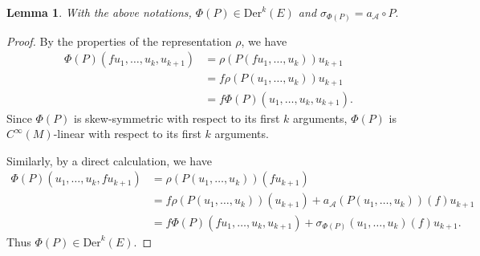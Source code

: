 \documentclass[10pt,a4paper]{amsart}
\numberwithin{equation}{section}
\newtheorem{lem}[thm]{Lemma}
\newcommand{\huaA}{\mathcal{A}}
\newcommand{\CWM}{C^{\infty}(M)}
\newcommand{\Der}{\mathrm{Der}}
\begin{document}
\begin{lem}%
With the above notations, $\Phi(P)\in \Der^{k}(E)$ and $\sigma_{\Phi(P)}=a_\huaA\circ P.$
\end{lem}
\begin{proof}
By the properties of the representation $\rho$, we have
\begin{align*}
\Phi(P)(fu_1,\dots,u_k,u_{k+1})&=\rho(P(fu_1,\dots,u_k))u_{k+1}
\\
&=f\rho(P(u_1,\dots,u_k))u_{k+1}
\\
&=f\Phi(P)(u_1,\dots,u_k,u_{k+1}).
\end{align*}
Since $\Phi(P)$ is skew-symmetric with respect to its first $k$ arguments, $\Phi(P)$ is $\CWM$-linear with respect to its first $k$ arguments.

Similarly, by a direct calculation, we have
\begin{align*}
\Phi(P)(u_1,\dots,u_k,fu_{k+1})&=\rho(P(u_1,\dots,u_k))(fu_{k+1})
\\
&=f\rho(P(u_1,\dots,u_k))(u_{k+1})+a_{\huaA}(P(u_1,\dots,u_k))(f)u_{k+1}
\\
&=f\Phi(P)(fu_1,\dots,u_k,u_{k+1})+\sigma_{\Phi(P)}(u_1,\dots,u_k)(f)u_{k+1}.
\end{align*}
Thus $\Phi(P)\in\Der^{k}(E)$.
\end{proof}
\end{document}
